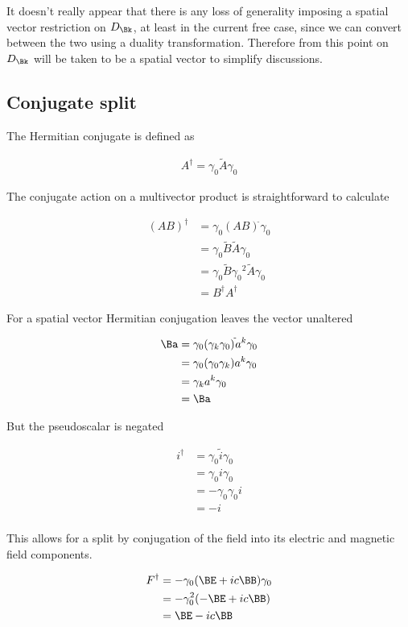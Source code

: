 \documentclass[]{eliblog}
\begin{document}
It doesn't really appear that there is any loss of generality imposing a spatial vector restriction on $D_\Bk$, at
least in the current free case, since we can convert between the two using a duality transformation.
Therefore from this point on $D_\Bk$ will be taken to be a spatial vector to simplify discussions.

\subsection{Conjugate split}

The Hermitian conjugate is defined as

\begin{align}
A^\dagger = \gamma_0 \tilde{A} \gamma_0
\end{align}

The conjugate action on a multivector product is straightforward to calculate

\begin{align*}
(A B)^\dagger 
&= \gamma_0 (A B)^{\tilde{}} \gamma_0 \\
&= \gamma_0 \tilde{B} \tilde{A} \gamma_0 \\
&= \gamma_0 \tilde{B} {\gamma_0}^2 \tilde{A} \gamma_0 \\
&= B^\dagger A^\dagger
\end{align*}

For a spatial vector Hermitian conjugation leaves the vector unaltered

\begin{align*}
\Ba 
&= \gamma_0 (\gamma_k \gamma_0)^{\tilde{}} a^k \gamma_0 \\
&= \gamma_0 (\gamma_0 \gamma_k) a^k \gamma_0 \\
&= \gamma_k a^k \gamma_0 \\
&= \Ba
\end{align*}

But the pseudoscalar is negated

\begin{align*}
i^\dagger 
&=
\gamma_0 \tilde{i} \gamma_0 \\
&=
\gamma_0 i \gamma_0 \\
&=
-\gamma_0 \gamma_0 i \\
&=
- i \\
\end{align*}

This allows for a split by conjugation of the field into its electric and magnetic field components.

\begin{align*}
F^\dagger
&= -\gamma_0 ( \BE + i c \BB) \gamma_0 \\
&= -\gamma_0^2 ( -\BE + i c \BB) \\
&= \BE - i c\BB \\
\end{align*}
\end{document}
